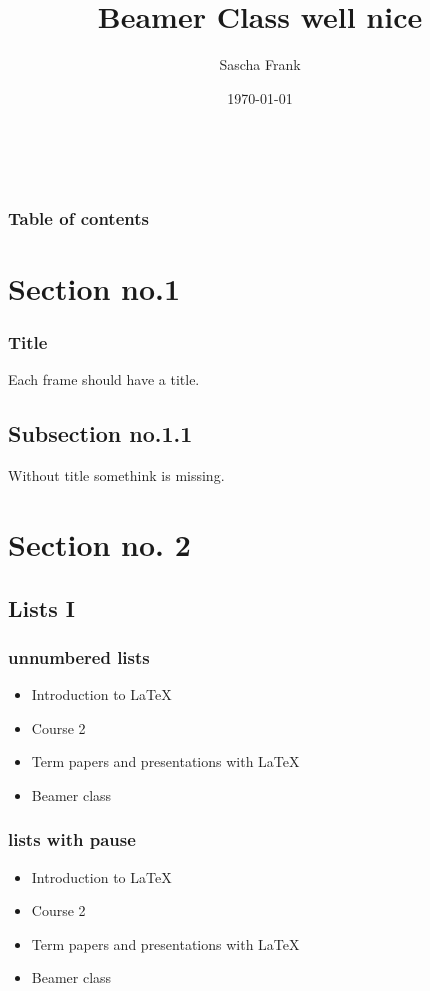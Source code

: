 \documentclass{beamer}
\begin{document}
\title{Beamer Class well nice}  
\author{Sascha Frank}
\date{\today}

\begin{frame}
\titlepage\
\end{frame}

\begin{frame}\frametitle{Table of contents}\tableofcontents
\end{frame}


\section{Section no.1} 
\begin{frame}\frametitle{Title} 
Each frame should have a title.
\end{frame}
\subsection{Subsection no.1.1  }
\begin{frame} 
Without title somethink is missing. 
\end{frame}


\section{Section no. 2} 
\subsection{Lists I}
\begin{frame}\frametitle{unnumbered lists}
\begin{itemize}
\item Introduction to  \LaTeX\
\item Course 2
\item Term papers and presentations with \LaTeX\
\item Beamer class
\end{itemize} 
\end{frame}

\begin{frame}\frametitle{lists with pause}
\begin{itemize}
\item Introduction to  \LaTeX\ \pause\
\item Course 2 \pause\
\item Term papers and presentations with \LaTeX\ \pause\
\item Beamer class
\end{itemize} 
\end{frame}
\end{document}
